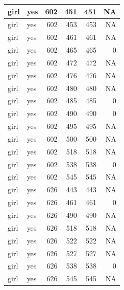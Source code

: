 \documentclass[man]{apa6}
\begin{document}
\begin{tabular}{l|l|r|r|r|r}
\hline
girl & yes & 602 & 451 & 451 & NA\\
\hline
girl & yes & 602 & 453 & 453 & NA\\
\hline
girl & yes & 602 & 461 & 461 & NA\\
\hline
girl & yes & 602 & 465 & 465 & 0\\
\hline
girl & yes & 602 & 472 & 472 & NA\\
\hline
girl & yes & 602 & 476 & 476 & NA\\
\hline
girl & yes & 602 & 480 & 480 & NA\\
\hline
girl & yes & 602 & 485 & 485 & 0\\
\hline
girl & yes & 602 & 490 & 490 & 0\\
\hline
girl & yes & 602 & 495 & 495 & NA\\
\hline
girl & yes & 602 & 500 & 500 & NA\\
\hline
girl & yes & 602 & 518 & 518 & NA\\
\hline
girl & yes & 602 & 538 & 538 & 0\\
\hline
girl & yes & 602 & 545 & 545 & NA\\
\hline
girl & yes & 626 & 443 & 443 & NA\\
\hline
girl & yes & 626 & 461 & 461 & 0\\
\hline
girl & yes & 626 & 490 & 490 & NA\\
\hline
girl & yes & 626 & 518 & 518 & NA\\
\hline
girl & yes & 626 & 522 & 522 & NA\\
\hline
girl & yes & 626 & 527 & 527 & NA\\
\hline
girl & yes & 626 & 538 & 538 & 0\\
\hline
girl & yes & 626 & 545 & 545 & NA\\
\hline
\end{tabular}
\end{document}
